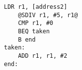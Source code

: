 \begin{lstlisting}[style=AsmStyle]
    LDR r1, [address2]
    @SDIV r1, #5, r1@
    CMP r1, #0
    BEQ taken
    B end
taken:
    ADD r1, r1, #2
end:
\end{lstlisting}